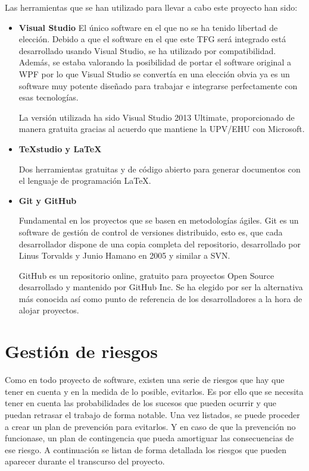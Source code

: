 Las herramientas que se han utilizado para llevar a cabo este proyecto han sido:
\begin{itemize}
    \item 
    \textbf{Visual Studio}
    El \'unico software en el que no se ha tenido libertad de elecci\'on. Debido a que el 
    software en el que este TFG
    ser\'a integrado est\'a desarrollado usando Visual Studio, se ha utilizado por 
    compatibilidad. Adem\'as, se estaba
    valorando la posibilidad de portar el software original a WPF por lo que Visual Studio se 
    convert\'ia en una elecci\'on
    obvia ya es un software muy potente dise\~nado para trabajar e integrarse perfectamente con 
    esas tecnolog\'ias.

    La versi\'on utilizada ha sido Visual Studio 2013 Ultimate, proporcionado de manera gratuita 
    gracias al acuerdo que mantiene 
    la UPV/EHU con Microsoft.
    
    \item 
    \textbf{TeXstudio y \LaTeX}
    
    Dos herramientas gratuitas y de código abierto para generar documentos con el lenguaje de 
    programaci\'on \LaTeX.
    
    \item
    \textbf{Git y GitHub}
    
    Fundamental en los proyectos que se basen en metodologías ágiles. Git es un software de 
    gestión de control de versiones 
    distribuido, esto es, que cada desarrollador dispone de una copia completa del repositorio, 
    desarrollado por Linus Torvalds y 
    Junio Hamano en 2005 y similar a SVN.
    
    GitHub es un repositorio online, gratuito para proyectos Open Source desarrollado y mantenido 
    por GitHub Inc. Se ha elegido
    por ser la alternativa m\'as conocida as\'i como punto de referencia de los desarrolladores a 
    la hora de alojar proyectos.
    
\end{itemize}

\section{Gesti\'{o}n de riesgos}
Como en todo proyecto de software, existen una serie de riesgos que hay que tener en cuenta y en 
la medida de lo posible,
evitarlos. Es por ello que se necesita tener en cuenta las probabilidades de los sucesos que 
pueden ocurrir y que puedan retrasar el trabajo de forma notable. Una vez
listados, se puede proceder a crear un plan de prevención para evitarlos. Y en caso de que la 
prevenci\'on no
funcionase, un plan de contingencia que pueda amortiguar las consecuencias de ese riesgo. A 
continuación
se listan de forma detallada los riesgos que pueden aparecer durante el transcurso del proyecto.

